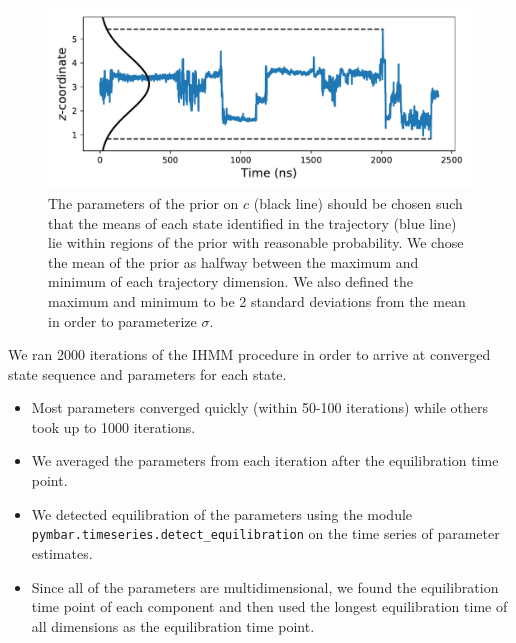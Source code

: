 \documentclass{article}
\begin{document}
  \begin{figure}
  \centering
  \includegraphics[width=\textwidth]{prior_guesses.pdf}
  \caption{The parameters of the prior on $c$ (black line) should be chosen such
  that the means of each state identified in the trajectory (blue line) lie within
  regions of the prior with reasonable probability. We chose the mean of the prior 
  as halfway between the maximum and minimum of each trajectory dimension. We also
  defined the maximum and minimum to be 2 standard deviations from the mean in 
  order to parameterize $\sigma$.}\label{fig:prior_guesses}
  \end{figure}
  
  We ran 2000 iterations of the IHMM procedure in order to arrive at converged 
  state sequence and parameters for each state.
  \begin{itemize}  
    \item Most parameters converged quickly (within 50-100 iterations) while
    others took up to 1000 iterations.
    \item We averaged the parameters from each iteration after the equilibration
    time point.
    \item We detected equilibration of the parameters using the module 
    \texttt{pymbar.timeseries.detect\_equilibration} on the time series of 
    parameter estimates. 
    \item Since all of the parameters are multidimensional, we found the 
    equilibration time point of each component and then used the longest
    equilibration time of all dimensions as the equilibration time point.
  \end{itemize}
  
\end{document}
